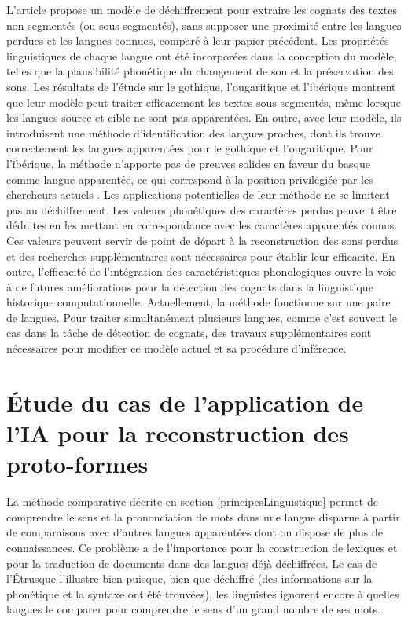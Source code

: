 \documentclass[12pt, french, twoside]{report}
\begin{document}
L'article propose un modèle de déchiffrement pour extraire les cognats des textes non-segmentés (ou sous-segmentés), sans supposer une proximité entre les langues perdues et les langues connues, comparé à leur papier précédent\cite{ugaritic-and-linear-B}. Les propriétés linguistiques de chaque langue ont été incorporées dans la conception du modèle, telles que la plausibilité phonétique du changement de son et la préservation des sons. Les résultats de l'étude sur le gothique, l'ougaritique et l'ibérique montrent que leur modèle peut traiter efficacement les textes sous-segmentés, même lorsque les langues source et cible ne sont pas apparentées. En outre, avec leur modèle, ils introduisent une méthode d'identification des langues proches, dont ils trouve correctement les langues apparentées pour le gothique et l'ougaritique. Pour l'ibérique, la méthode n'apporte pas de preuves solides en faveur du basque comme langue apparentée, ce qui correspond à la position privilégiée par les chercheurs actuels \cite{deepmind2022}. Les applications potentielles de leur méthode ne se limitent pas au déchiffrement. Les valeurs phonétiques des caractères perdus peuvent être déduites en les mettant en correspondance avec les caractères apparentés connus. Ces valeurs peuvent servir de point de départ à la reconstruction des sons perdus et des recherches supplémentaires sont nécessaires pour établir leur efficacité. En outre, l'efficacité de l'intégration des caractéristiques phonologiques ouvre la voie à de futures améliorations pour la détection des cognats dans la linguistique historique computationnelle. Actuellement, la méthode fonctionne sur une paire de langues. Pour traiter simultanément plusieurs langues, comme c'est souvent le cas dans la tâche de détection de cognats, des travaux supplémentaires sont nécessaires pour modifier ce modèle actuel et sa procédure d'inférence.\\

\chapter{Étude du cas de l'application de l'IA pour la reconstruction des proto-formes}
La méthode comparative décrite en section \ref{principesLinguistique} permet de comprendre le sens et la prononciation de mots dans une langue disparue à partir de comparaisons avec d'autres langues apparentées dont on dispose de plus de connaissances. Ce problème a de l'importance pour la construction de lexiques et pour la traduction de documents dans des langues déjà déchiffrées. Le cas de l'Étrusque l'illustre bien puisque, bien que déchiffré (des informations sur la phonétique et la syntaxe ont été trouvées), les linguistes ignorent encore à quelles langues le comparer pour comprendre le sens d'un grand nombre de ses mots.\cite{bnf_etrusque}.
\end{document}
